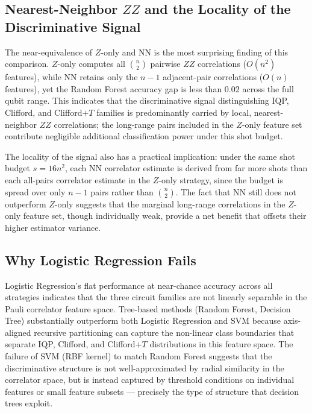 \documentclass[conference]{IEEEtran}
\newcommand{\nqubits}{n}
\newcommand{\shots}{s}
\begin{document}
\subsection{Nearest-Neighbor \texorpdfstring{$ZZ$}{ZZ} and the Locality of the Discriminative Signal}

The near-equivalence of $Z$-only and NN is the most surprising finding of this comparison.
$Z$-only computes all $\binom{\nqubits}{2}$ pairwise $ZZ$ correlations ($O(\nqubits^2)$ features), while NN retains only the $\nqubits - 1$ adjacent-pair correlations ($O(\nqubits)$ features), yet the Random Forest accuracy gap is less than $0.02$ across the full qubit range.
This indicates that the discriminative signal distinguishing IQP, Clifford, and Clifford$+T$ families is predominantly carried by local, nearest-neighbor $ZZ$ correlations; the long-range pairs included in the $Z$-only feature set contribute negligible additional classification power under this shot budget.

The locality of the signal also has a practical implication: under the same shot budget $\shots = 16\nqubits^2$, each NN correlator estimate is derived from far more shots than each all-pairs correlator estimate in the $Z$-only strategy, since the budget is spread over only $\nqubits - 1$ pairs rather than $\binom{\nqubits}{2}$.
The fact that NN still does not outperform $Z$-only suggests that the marginal long-range correlations in the $Z$-only feature set, though individually weak, provide a net benefit that offsets their higher estimator variance.

\subsection{Why Logistic Regression Fails}

Logistic Regression's flat performance at near-chance accuracy across all strategies indicates that the three circuit families are not linearly separable in the Pauli correlator feature space.
Tree-based methods (Random Forest, Decision Tree) substantially outperform both Logistic Regression and SVM because axis-aligned recursive partitioning can capture the non-linear class boundaries that separate IQP, Clifford, and Clifford$+T$ distributions in this feature space.
The failure of SVM (RBF kernel) to match Random Forest suggests that the discriminative structure is not well-approximated by radial similarity in the correlator space, but is instead captured by threshold conditions on individual features or small feature subsets --- precisely the type of structure that decision trees exploit.
\end{document}

